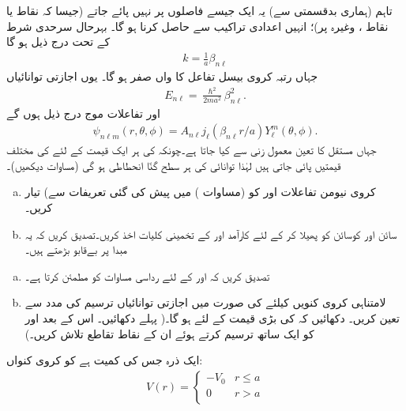  تاہم (ہماری بدقسمتی سے) یہ ایک جیسے فاصلوں پر نہیں پائے جاتے  (جیسا کہ نقاط  یا نقاط ، وغیرہ پر)؛ انہیں اعدادی تراکیب سے حاصل کرنا ہو گا۔ بہرحال سرحدی شرط کے تحت درج ذیل ہو گا
\begin{align}
k=\frac{1}{a}\beta_{n\ell} 
\end{align}
جہاں  رتبہ     کروی بیسل تفاعل کا  واں صفر   ہو گا۔ یوں اجازتی توانائیاں 
\begin{align}\label{مساوات_ابعاد_کروی_کنواں_اجازتی_توانائیاں}
E_{n\ell}=\frac{\hslash^{2}}{2ma^{2}}\beta_{n\ell}^{2}. 
\end{align}
اور تفاعلات موج درج ذیل ہوں گے 
\begin{align}
\psi_{n\ell m}(r,\theta,\phi)=A_{n\ell}j_{\ell}(\beta_{n\ell}r/a)Y_{\ell}^{m}(\theta,\phi). 
\end{align}
جہاں مستقل  کا تعین معمول زنی سے کیا جاتا ہے۔چونکہ  کی ہر ایک قیمت کے لئے  کی 
مختلف قیمتیں پائی جاتی ہیں لہٰذا توانائی کی ہر سطح  گنّا انحطاطی ہو گی (مساوات  دیکھیں)۔
\begin{enumerate}[a.]
\item
کروی نیومن تفاعلات  اور  کو (مساوات ) میں پیش کی گئی تعریفات سے)  تیار کریں۔
\item
سائن اور کوسائن کو پھیلا کر  کے لئے كارآمد   اور  کے  تخمینی کلیات  اخذ کریں۔تصدیق کریں کہ یہ مبدا پر بےقابو بڑھتے ہیں۔
\end{enumerate}
%
\begin{enumerate}[a.]
\item
 تصدیق کریں کہ  اور  کے لئے  رداسی مساوات کو مطمئن کرتا ہے۔
\item
لامتناہی کروی کنویں  کیلئے  کی صورت میں اجازتی توانائیاں ترسیم کی مدد سے تعین کریں۔ دکھائیں کہ  کی بڑی قیمت کے لئے 
 ہو گا۔( پہلے  
 دکھائیں۔ اس کے بعد  اور  کو ایک ساتھ ترسیم کرتے ہوئے ان کے نقاط تقاطع تلاش کریں۔)
\end{enumerate}
%
 ایک ذرہ جس کی کمیت  ہے کو  کروی کنواں:
\begin{align*}
V(r)=\begin{cases}-V_{0}&r\le a\\0&r>a\\\end{cases} 
\end{align*}
